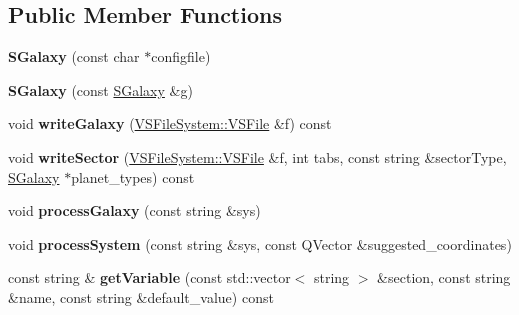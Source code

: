 \subsection*{Public Member Functions}
\begin{DoxyCompactItemize}
\item 
{\bfseries S\+Galaxy} (const char $\ast$configfile)\hypertarget{classGalaxyXML_1_1SGalaxy_a56fdcfd4fe6e9c849b1b5a5d6d75bd4e}{}\label{classGalaxyXML_1_1SGalaxy_a56fdcfd4fe6e9c849b1b5a5d6d75bd4e}

\item 
{\bfseries S\+Galaxy} (const \hyperlink{classGalaxyXML_1_1SGalaxy}{S\+Galaxy} \&g)\hypertarget{classGalaxyXML_1_1SGalaxy_a26e6c751be70af67ede9c138243e4dba}{}\label{classGalaxyXML_1_1SGalaxy_a26e6c751be70af67ede9c138243e4dba}

\item 
void {\bfseries write\+Galaxy} (\hyperlink{classVSFileSystem_1_1VSFile}{V\+S\+File\+System\+::\+V\+S\+File} \&f) const \hypertarget{classGalaxyXML_1_1SGalaxy_a77bc06c6448d4e5fdb7ea9ee3e535a90}{}\label{classGalaxyXML_1_1SGalaxy_a77bc06c6448d4e5fdb7ea9ee3e535a90}

\item 
void {\bfseries write\+Sector} (\hyperlink{classVSFileSystem_1_1VSFile}{V\+S\+File\+System\+::\+V\+S\+File} \&f, int tabs, const string \&sector\+Type, \hyperlink{classGalaxyXML_1_1SGalaxy}{S\+Galaxy} $\ast$planet\+\_\+types) const \hypertarget{classGalaxyXML_1_1SGalaxy_a82285a3d77b63eac9f0193aa3e0ce8e5}{}\label{classGalaxyXML_1_1SGalaxy_a82285a3d77b63eac9f0193aa3e0ce8e5}

\item 
void {\bfseries process\+Galaxy} (const string \&sys)\hypertarget{classGalaxyXML_1_1SGalaxy_ac0200458e3954c66ceeff1c1f90af778}{}\label{classGalaxyXML_1_1SGalaxy_ac0200458e3954c66ceeff1c1f90af778}

\item 
void {\bfseries process\+System} (const string \&sys, const Q\+Vector \&suggested\+\_\+coordinates)\hypertarget{classGalaxyXML_1_1SGalaxy_a14b4e1054d8f6544c4e899bc25ec00c2}{}\label{classGalaxyXML_1_1SGalaxy_a14b4e1054d8f6544c4e899bc25ec00c2}

\item 
const string \& {\bfseries get\+Variable} (const std\+::vector$<$ string $>$ \&section, const string \&name, const string \&default\+\_\+value) const \hypertarget{classGalaxyXML_1_1SGalaxy_acf167ef8d20954425857ec3576bedc1e}{}\label{classGalaxyXML_1_1SGalaxy_acf167ef8d20954425857ec3576bedc1e}


\end{DoxyCompactItemize}
